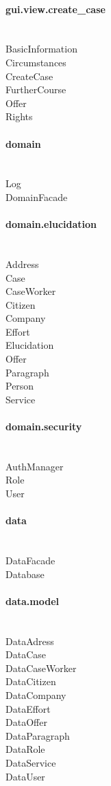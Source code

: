 \documentclass[../main.tex]{subfiles}
\begin{document}
\paragraph{gui.view.create\_case}\mbox{} \\
BasicInformation \\
Circumstances \\
CreateCase \\
FurtherCourse \\
Offer \\
Rights 

\paragraph{domain}\mbox{} \\
Log \\
DomainFacade

\paragraph{domain.elucidation}\mbox{} \\
Address \\
Case \\
CaseWorker \\
Citizen \\
Company \\
Effort \\
Elucidation \\
Offer \\
Paragraph \\
Person \\
Service

\paragraph{domain.security}\mbox{} \\
AuthManager \\
Role \\
User

\paragraph{data}\mbox{} \\
DataFacade \\
Database

\paragraph{data.model}\mbox{} \\
DataAdress \\
DataCase \\
DataCaseWorker \\
DataCitizen \\
DataCompany \\
DataEffort \\
DataOffer \\
DataParagraph \\
DataRole \\
DataService \\
DataUser
\end{document}
